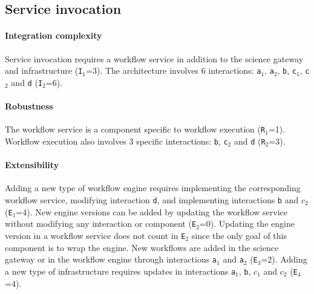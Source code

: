\documentclass[preprint,3p,twocolumn]{elsarticle}
\begin{document}
\subsection{Service invocation}

\paragraph{Integration complexity} Service invocation requires a workflow service
in addition to the science gateway and infrastructure
(\texttt{I$_1$}=3). The architecture involves 6 interactions:
\texttt{a$_1$}, \texttt{a$_2$}, \texttt{b}, \texttt{c$_1$},
\texttt{c$_2$} and \texttt{d} (\texttt{I$_2$}=6).

\paragraph{Robustness} The workflow service is a component specific to
workflow execution (\texttt{R$_1$}=1). Workflow execution also
involves 3 specific interactions: \texttt{b},
\texttt{c$_2$} and \texttt{d} (\texttt{R$_2$}=3).

\paragraph{Extensibility} Adding a new type of workflow engine
requires implementing the corresponding workflow service,  modifying
interaction \texttt{d}, and  implementing interactions \texttt{b} and
\texttt{$c_2$} (\texttt{E$_1$}=4). New engine versions can be added by
updating the workflow service without modifying any interaction or
component (\texttt{E$_2$}=0). Updating the engine version in a
workflow service does not count in \texttt{E$_2$} since the only goal of this component
is to wrap the engine.  New workflows are added in the science gateway
or in the workflow engine through interactions \texttt{a$_1$} and
\texttt{a$_2$} (\texttt{E$_3$}=2). Adding a new type of infrastructure
requires updates in interactions \texttt{a$_1$}, \texttt{b},
\texttt{$c_1$} and \texttt{$c_2$} (\texttt{E$_4$}=4).
\end{document}
